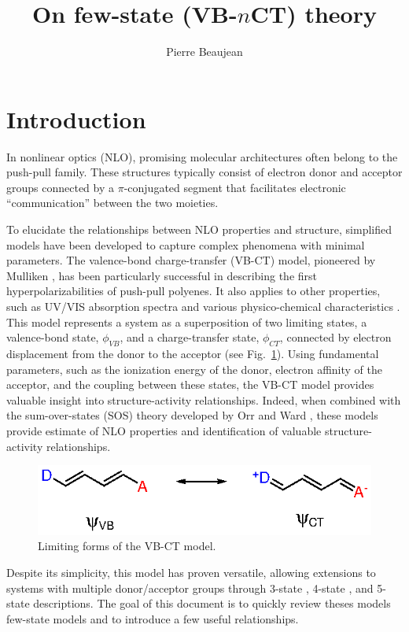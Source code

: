 \documentclass[12pt,a4paper]{article}
\title{On few-state (VB-$n$CT) theory}
\author{Pierre Beaujean}
\begin{document}
	\maketitle
	
	\section{Introduction}
	
In nonlinear optics (NLO), promising molecular architectures often belong to the push-pull family. These structures typically consist of electron donor and acceptor groups connected by a $\pi$-conjugated segment that facilitates electronic ``communication'' between the two moieties.

To elucidate the relationships between NLO properties and structure, simplified models have been developed to capture complex phenomena with minimal parameters. The valence-bond charge-transfer (VB-CT) model, pioneered by Mulliken \cite{mullikenMolecularCompoundsTheir1952}, has been particularly successful in describing the first hyperpolarizabilities of push-pull polyenes. It also applies to other properties, such as UV/VIS absorption spectra and various physico-chemical characteristics \cite{benderTheoreticalModelsChargetransfer1986}. This model represents a system as a superposition of two limiting states, a valence-bond state, $\phi_{VB}$, and a charge-transfer state, $\phi_{CT}$, connected by electron displacement from the donor to the acceptor (see Fig.~\ref{sc:vbct}). Using fundamental parameters, such as the ionization energy of the donor, electron affinity of the acceptor, and the coupling between these states, the VB-CT model provides valuable insight into structure-activity relationships.  Indeed, when combined with the sum-over-states (SOS) theory developed by Orr and Ward \cite{orrPerturbationTheoryNonlinear1971}, these models provide estimate of NLO properties and identification of valuable structure-activity relationships.


\begin{figure}[!h]
	\centering
	\includegraphics[width=.5\linewidth]{Scheme1}
	\caption{Limiting forms of the VB-CT model.}
	\label{sc:vbct}
\end{figure}

Despite its simplicity, this model has proven versatile, allowing extensions to systems with multiple donor/acceptor groups through 3-state \cite{hahnNonlinearOpticalProperties1999,barzoukasMolecularEngineeringPush2000,yangLargeOffDiagonalContribution2003}, 4-state \cite{choElementaryDescriptionNonlinear1998}, and 5-state \cite{choNonlinearOpticalProperties2002} descriptions.
The goal of this document is to quickly review theses models few-state models and to introduce a few useful relationships.
\end{document}
